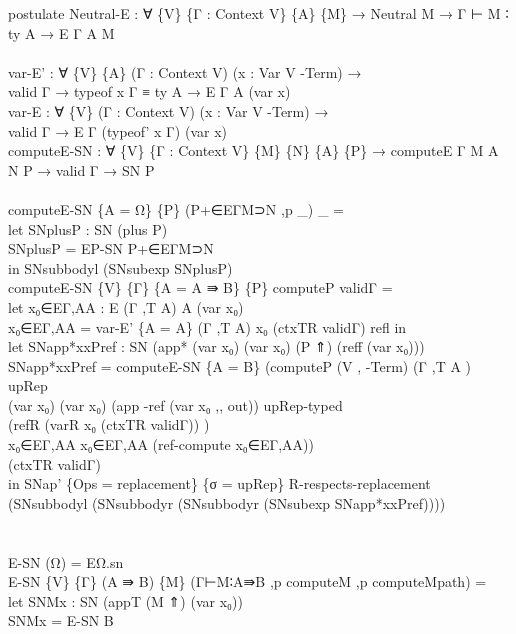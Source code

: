 {\begin{code}
{\>postulate Neutral-E : ∀ \{V\} \{Γ : Context V\} \{A\} \{M\} → Neutral M → Γ ⊢ M ∶ ty A → E Γ A M\<\\
\>\<\\
\>var-E' : ∀ \{V\} \{A\} (Γ : Context V) (x : Var V -Term) → \<\\
\>  valid Γ → typeof x Γ ≡ ty A → E Γ A (var x)\<\\
\>var-E : ∀ \{V\} (Γ : Context V) (x : Var V -Term) → \<\\
\>        valid Γ → E Γ (typeof' x Γ) (var x)\<\\
\>computeE-SN : ∀ \{V\} \{Γ : Context V\} \{M\} \{N\} \{A\} \{P\} → computeE Γ M A N P → valid Γ → SN P\<\\
\>\<\\
\>computeE-SN \{A = Ω\} \{P\} (P+∈EΓM⊃N ,p \_) \_ = \<\\
\>  let SNplusP : SN (plus P)\<\\
\>      SNplusP = EP-SN P+∈EΓM⊃N \<\\
\>  in SNsubbodyl (SNsubexp SNplusP)\<\\
\>computeE-SN \{V\} \{Γ\} \{A = A ⇛ B\} \{P\} computeP validΓ =\<\\
\>  let x₀∈EΓ,AA : E (Γ ,T A) A (var x₀)\<\\
\>      x₀∈EΓ,AA = var-E' \{A = A\} (Γ ,T A) x₀ (ctxTR validΓ) refl in\<\\
\>  let SNapp*xxPref : SN (app* (var x₀) (var x₀) (P ⇑) (reff (var x₀)))\<\\
\>      SNapp*xxPref = computeE-SN \{A = B\} (computeP (V , -Term) (Γ ,T A ) upRep \<\\
\>          (var x₀) (var x₀) (app -ref (var x₀ ,, out)) upRep-typed \<\\
\>          (refR (varR x₀ (ctxTR validΓ)) )\<\\
\>          x₀∈EΓ,AA x₀∈EΓ,AA (ref-compute x₀∈EΓ,AA)) \<\\
\>          (ctxTR validΓ)\<\\
\>  in SNap' \{Ops = replacement\} \{σ = upRep\} R-respects-replacement (SNsubbodyl (SNsubbodyr (SNsubbodyr (SNsubexp SNapp*xxPref))))\<\\
\>\<\\
\>\<\\
\>E-SN (Ω) = EΩ.sn\<\\
\>E-SN \{V\} \{Γ\} (A ⇛ B) \{M\} (Γ⊢M∶A⇛B ,p computeM ,p computeMpath) =\<\\
\>  let SNMx : SN (appT (M ⇑) (var x₀))\<\\
\>      SNMx = E-SN B \<\\
}
\end{code}}
